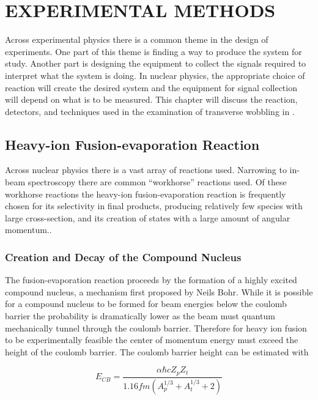 %
%

\chapter{EXPERIMENTAL METHODS}
\label{chp:exp-pr}
Across experimental physics there is a common theme in the design of experiments. One part of this theme is finding a way to produce the system for study. Another part is designing the equipment to collect the signals required to interpret what the system is doing. In nuclear physics, the appropriate choice of reaction will create the desired system and the equipment for signal collection will depend on what is to be measured. This chapter will discuss the reaction, detectors, and techniques used in the examination of transverse wobbling in \pr{}.
\section{Heavy-ion Fusion-evaporation Reaction}
\label{sec:exp-pr-fus-evap}
Across nuclear physics there is a vast array of reactions used. Narrowing to in-beam \gr{} spectroscopy there are common ``workhorse'' reactions used. Of these workhorse reactions the heavy-ion fusion-evaporation reaction is frequently chosen for its selectivity in final products, producing relatively few species with large cross-section, and its creation of states with a large amount of angular momentum.\cite{beausang1996arrays}.
\subsection{Creation and Decay of the Compound Nucleus}
\label{ssec:exp-pr-fus-evap-cn}
The fusion-evaporation reaction proceeds by the formation of a highly excited compound nucleus, a mechanism first proposed by Neils Bohr\cite{bohr1936neutron}. While it is possible for a compound nucleus to be formed for beam energies below the coulomb barrier the probability is dramatically lower as the beam must quantum mechanically tunnel through the coulomb barrier. Therefore for heavy ion fusion to be experimentally feasible the center of momentum energy must exceed the height of the coulomb barrier. The coulomb barrier height can be estimated with

\begin{equation}
\label{eqn:chp3-cb_en}
E_{CB}=\frac{\alpha \hbar c Z_p Z_t}{1.16 fm (A_p^{1/3} + A_t^{1/3} + 2)}
\end{equation}

